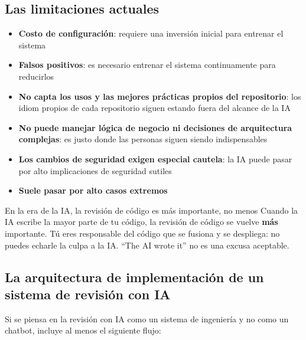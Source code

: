 \subsection{Las limitaciones actuales}

\begin{itemize}
    \item \textbf{Costo de configuración}: requiere una inversión inicial para entrenar el sistema
    \item \textbf{Falsos positivos}: es necesario entrenar el sistema continuamente para reducirlos
    \item \textbf{No capta los usos y las mejores prácticas propios del repositorio}: los idiom propios de cada repositorio siguen estando fuera del alcance de la IA
    \item \textbf{No puede manejar lógica de negocio ni decisiones de arquitectura complejas}: es justo donde las personas siguen siendo indispensables
    \item \textbf{Los cambios de seguridad exigen especial cautela}: la IA puede pasar por alto implicaciones de seguridad sutiles
    \item \textbf{Suele pasar por alto casos extremos}
\end{itemize}

\begin{warningbox}{En la era de la IA, la revisión de código es más importante, no menos}
Cuando la IA escribe la mayor parte de tu código, la revisión de código se vuelve \textbf{más} importante. Tú eres responsable del código que se fusiona y se despliega: no puedes echarle la culpa a la IA. ``The AI wrote it'' no es una excusa aceptable.
\end{warningbox}

\subsection{La arquitectura de implementación de un sistema de revisión con IA}

Si se piensa en la revisión con IA como un sistema de ingeniería y no como un chatbot, incluye al menos el siguiente flujo:

